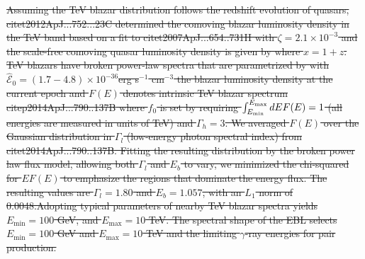 \documentclass[numberedappendix]{emulateapj}
\begin{document}
{\sout{
Assuming the TeV blazar distribution follows the redshift evolution of
quasars, citet{2012ApJ...752...23C} determined the comoving blazar
luminosity density in the TeV band based on a fit to
citet{2007ApJ...654..731H}
with $\zeta=2.1\times 10^{-3}$ and the scale-free comoving quasar luminosity density is given by
where $x=1+z$. TeV blazars have broken power-law spectra that are parametrized by
with $\hat{\mathcal{E}}_0=(1.7-4.8)\times 10^{-36}$erg s$^{-1}$ cm$^{-3}$ the blazar luminosity density at the current epoch and $F(E)$ denotes intrinsic TeV blazar spectrum citep{2014ApJ...790..137B}
where $f_0$ is set by requiring $\int_{E_{\rm min}}^{E_{\rm max}} dE F(E) = 1$ (all energies are measured in units of TeV) and $\Gamma_h=3$. We averaged $F(E)$ over the Gaussian distribution in $\Gamma_l$ (low-energy photon spectral index) from citet{2014ApJ...790..137B}. Fitting the resulting distribution by the broken power law flux model, allowing both $\Gamma_l$ and $E_b$ to vary, we minimized the chi-squared for $E F(E)$ to emphasize the regions that dominate the energy flux. The resulting values are  $\Gamma_l=1.80$ and $E_b=1.057$, with an $L_1$ norm of 0.0048.Adopting typical parameters of nearby TeV blazar spectra yields $E_{\mathrm{min}}=100$ GeV, and $E_{\mathrm{max}}=10$ TeV. The spectral shape of the EBL selects $E_{\mathrm{min}}=100$ GeV and $E_{\mathrm{max}}=10$ TeV and the limiting $\gamma$-ray energies for pair production.
}}
\end{document}
